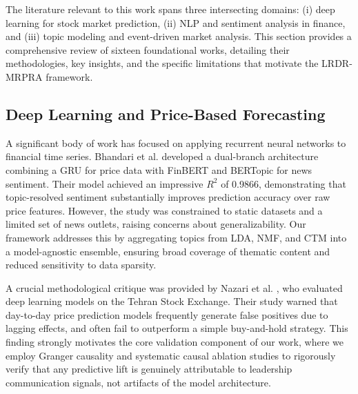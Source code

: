 \documentclass[11pt]{article}
\begin{document}
The literature relevant to this work spans three intersecting domains: (i) deep learning for stock market prediction, (ii) NLP and sentiment analysis in finance, and (iii) topic modeling and event-driven market analysis. This section provides a comprehensive review of sixteen foundational works, detailing their methodologies, key insights, and the specific limitations that motivate the LRDR-MRPRA framework.

\subsection{Deep Learning and Price-Based Forecasting}

A significant body of work has focused on applying recurrent neural networks to financial time series. Bhandari et al. \cite{bhandari2025} developed a dual-branch architecture combining a GRU for price data with FinBERT and BERTopic for news sentiment. Their model achieved an impressive $R^2$ of 0.9866, demonstrating that topic-resolved sentiment substantially improves prediction accuracy over raw price features. However, the study was constrained to static datasets and a limited set of news outlets, raising concerns about generalizability. Our framework addresses this by aggregating topics from LDA, NMF, and CTM into a model-agnostic ensemble, ensuring broad coverage of thematic content and reduced sensitivity to data sparsity.

A crucial methodological critique was provided by Nazari et al. \cite{nazari2025}, who evaluated deep learning models on the Tehran Stock Exchange. Their study warned that day-to-day price prediction models frequently generate false positives due to lagging effects, and often fail to outperform a simple buy-and-hold strategy. This finding strongly motivates the core validation component of our work, where we employ Granger causality and systematic causal ablation studies to rigorously verify that any predictive lift is genuinely attributable to leadership communication signals, not artifacts of the model architecture.
\end{document}
